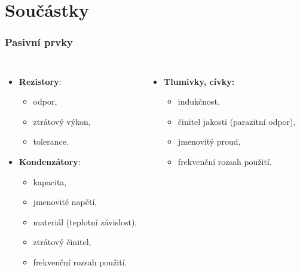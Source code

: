 \documentclass{beamer}
\begin{document}
\section{\texorpdfstring{Součástky}{Soucastky}}
  \begin{frame}
    \frametitle{Pasivní prvky}
    \begin{columns}
    
    \begin{itemize}
      \item \textbf{Rezistory}:
        \begin{itemize}
          \item odpor,
          \item ztrátový výkon,
          \item tolerance.
        \end{itemize}
        
      \item \textbf{Kondenzátory}:
        \begin{itemize}
          \item kapacita,
          \item jmenovité napětí, 
          \item materiál (teplotní závislost),
          \item ztrátový činitel,
          \item frekvenční rozsah použití.
        \end{itemize}
    \end{itemize}
    
    \begin{itemize}
      \item \textbf{Tlumivky, cívky:}
        \begin{itemize}
          \item indukčnost,
          \item činitel jakosti (parazitní odpor),
          \item jmenovitý proud, 
          \item frekvenční rozsah použití.
        \end{itemize}
    \end{itemize}
    \end{columns}
  \end{frame}
\end{document}
